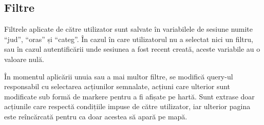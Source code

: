 \documentclass[12pt,a4paper]{report}
\begin{document}
\newpage
\subsection{Filtre}
\par
Filtrele aplicate de către utilizator sunt salvate în variabilele de sesiune numite “jud”, “oras” și “categ”. În cazul în care utilizatorul nu a selectat nici un filtru, sau în cazul autentificării unde sesiunea a fost recent creată, aceste variabile au o valoare nulă.
\\
\par
În momentul aplicării unuia sau a mai multor filtre, se modifică query-ul responsabil cu selectarea acțiunilor semnalate, acțiuni care ulterior sunt modificate sub formă de markere pentru a fi afișate pe hartă. Sunt extrase doar acțiunile care respectă condițiile impuse de către utilizator, iar ulterior pagina este reîncărcată pentru ca doar acestea să apară pe mapă.
\\
\end{document}
